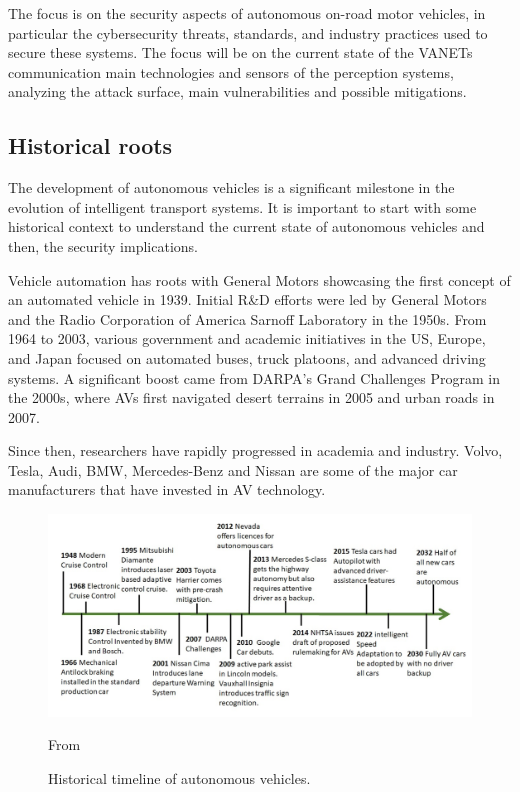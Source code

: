 The focus is on the security aspects of autonomous on-road motor vehicles,
in particular the cybersecurity threats, standards, and industry practices used to secure these systems.
The focus will be on the current state of the VANETs communication main technologies and sensors of the perception systems,
analyzing the attack surface, main vulnerabilities and possible mitigations.

\subsection{Historical roots}\label{subsec:historical-roots}

The development of autonomous vehicles is a significant milestone in the evolution of intelligent transport systems.
It is important to start with some historical context to understand the current state of autonomous vehicles and then,
the security implications.

Vehicle automation has roots with General Motors showcasing the first concept of an automated vehicle in 1939.
Initial R\&D efforts were led by General Motors and the Radio Corporation of America Sarnoff Laboratory in the 1950s.
From 1964 to 2003, various government and academic initiatives in the US, Europe,
and Japan focused on automated buses, truck platoons, and advanced driving systems\cite{pendleton2017perception, shladover2017connected}.
A significant boost came from DARPA’s Grand Challenges Program in the 2000s\cite{darpa_grand_challenges_book},
where AVs first navigated desert terrains in 2005 and urban roads in 2007\cite{pendleton2017perception, shladover2017connected}.

Since then, researchers have rapidly progressed in academia and industry.
Volvo, Tesla, Audi, BMW,
Mercedes-Benz and Nissan are some of the major car manufacturers that have invested in AV technology\cite{faisal2019understanding}.

\begin{figure}[!htb]
    \centering
    \includegraphics[width=0.7\linewidth]{figures/history}
    \caption{Historical timeline of autonomous vehicles.}
    \footnotesize{From \cite{ahangar2021survey} }
    \label{fig:history}
\end{figure}

